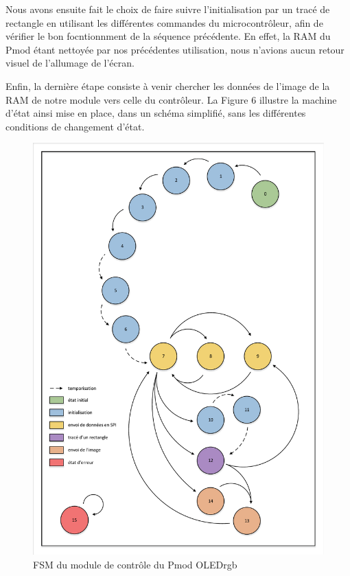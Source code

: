 \documentclass[11pt]{article}
\begin{document}
Nous avons ensuite fait le choix de faire suivre l'initialisation par un tracé de rectangle en utilisant les différentes commandes du microcontrôleur, afin de vérifier le bon focntionnment de la séquence précédente. En effet, la RAM du Pmod étant nettoyée par nos précédentes utilisation, nous n'avions aucun retour visuel de l'allumage de l'écran.

Enfin, la dernière étape consiste à venir chercher les données de l'image de la RAM de notre module vers celle du contrôleur. La Figure 6 illustre la machine d'état ainsi mise en place, dans un schéma simplifié, sans les différentes conditions de changement d'état.

\begin{figure}[H]
\begin{center}
\includegraphics[scale = 0.67, keepaspectratio]{fsm_visio.pdf}
\caption{FSM du module de contrôle du Pmod OLEDrgb}
\end{center}
\end{figure}
\end{document}
